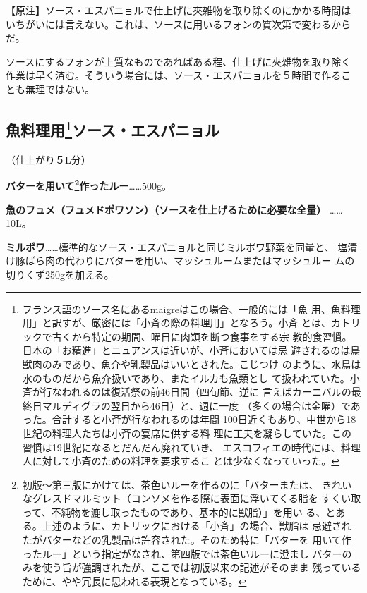 \documentclass[twoside,12Q,b5paper]{escoffierltjsbook}
\newenvironment{recette}{\begin{multicols}{2}}{\end{multicols}}
\begin{document}
\begin{recette}
【原注】ソース・エスパニョルで仕上げに夾雑物を取り除くのにかかる時間は
いちがいには言えない。これは、ソースに用いるフォンの質次第で変わるから
だ。

ソースにするフォンが上質なものであればある程、仕上げに夾雑物を取り除く
作業は早く済む。そういう場合には、ソース・エスパニョルを５時間で作るこ
とも無理ではない。

\subsection[魚料理用ソース・エスパニョル]{\texorpdfstring{魚料理用\footnote{フランス語のソース名にあるmaigreはこの場合、一般的には「魚
  用、魚料理用」と訳すが、厳密には「小斉の際の料理用」となろう。小斉
  とは、カトリックで古くから特定の期間、曜日に肉類を断つ食事をする宗
  教的食習慣。日本の「お精進」とニュアンスは近いが、小斉においては忌
  避されるのは鳥獣肉のみであり、魚介や乳製品はいいとされた。こじつけ
  のように、水鳥は水のものだから魚介扱いであり、またイルカも魚類とし
  て扱われていた。小斉が行なわれるのは復活祭の前46日間（四旬節、逆に
  言えばカーニバルの最終日マルディグラの翌日から46日）と、週に一度
  （多くの場合は金曜）であった。合計すると小斉が行なわれるのは年間
  100日近くもあり、中世から18世紀の料理人たちは小斉の宴席に供する料
  理に工夫を凝らしていた。この習慣は19世紀になるとだんだん廃れていき、
  エスコフィエの時代には、料理人に対して小斉のための料理を要求するこ
  とは少なくなっていった。}ソース・エスパニョル}{魚料理用ソース・エスパニョル}}\label{ux9b5aux6599ux7406ux75280102006ux30bdux30fcux30b9ux30a8ux30b9ux30d1ux30cbux30e7ux30eb}

（仕上がり５L分）

\textbf{バターを用いて\footnote{初版〜第三版にかけては、茶色いルーを作るのに「バターまたは、
  きれいなグレスドマルミット（コンソメを作る際に表面に浮いてくる脂を
  すくい取って、不純物を漉し取ったものであり、基本的に獣脂）」を用い
  る、とある。上述のように、カトリックにおける「小斉」の場合、獣脂は
  忌避されたがバターなどの乳製品は許容された。そのため特に「バターを
  用いて作ったルー」という指定がなされ、第四版では茶色いルーに澄まし
  バターのみを使う旨が強調されたが、ここでは初版以来の記述がそのまま
  残っているために、やや冗長に思われる表現となっている。}作ったルー}\ldots{}\ldots{}500g。

\textbf{魚のフュメ（フュメドポワソン）（ソースを仕上げるために必要な全量）
}\ldots{}\ldots{}10L。

\textbf{ミルポワ}\ldots{}\ldots{}標準的なソース・エスパニョルと同じミルポワ野菜を同量と、
塩漬け豚ばら肉の代わりにバターを用い、マッシュルームまたはマッシュルー
ムの切りくず250gを加える。


\end{recette}
\end{document}
